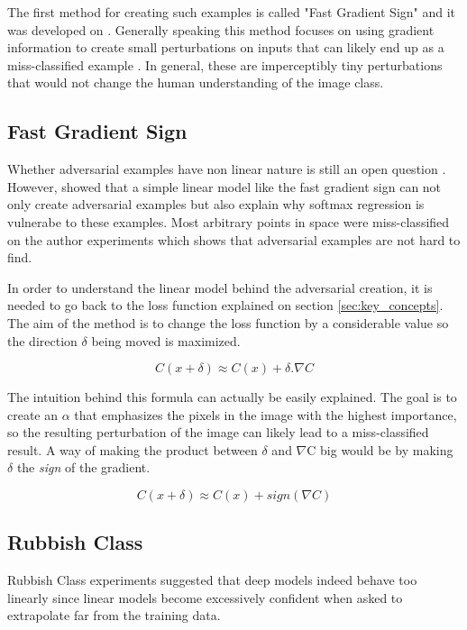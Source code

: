 \documentclass{article}
\begin{document}
The first method for creating such examples is called "Fast Gradient Sign" and it was developed on \cite{goodfellow2014}. Generally speaking this method focuses on using gradient information to create small perturbations on inputs that can likely end up as a miss-classified example \cite{goodfellow2016}. In general, these are imperceptibly tiny perturbations that would not change the human understanding of the image class.

\subsection{Fast Gradient Sign}\label{subsec:fast_gradient}

Whether adversarial examples have non linear nature is still an open question \cite{dalvi2004}. However, \cite{goodfellow2014} showed that a simple linear model like the fast gradient sign can not only create adversarial examples but also explain why softmax regression is vulnerabe to these examples.  Most arbitrary points in space were miss-classified on the author experiments which shows that adversarial examples are not hard to find.

In order to understand the linear model behind the adversarial creation, it is needed to go back to the loss function explained on section \ref{sec:key_concepts}. The aim of the method is to change the loss function by a considerable value so the direction $\delta$ being moved is maximized.

$$ C(x + \delta)\approx C(x) + \delta . \nabla C$$

The intuition behind this formula can actually be easily explained. The goal is to create an $\alpha$ that emphasizes the pixels in the image with the highest importance, so the resulting perturbation of the image can likely lead to a miss-classified result. A way of making the product between $\delta$ and $\nabla$C big would be by making $\delta$ the \textit{sign} of the gradient. 

$$ C(x + \delta)\approx C(x) + sign(\nabla C)$$
\subsection{Rubbish Class}\label{subsec:rubbish}

Rubbish Class experiments suggested that deep models indeed behave too linearly since linear models become excessively confident when asked to extrapolate far from the training data.



\end{document}
